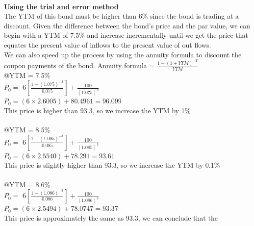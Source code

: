 \documentclass[12]{article}
\begin{document}
\noindent
\\
\textbf{Using the trial and error method}\\
The YTM of this bond must be higher than 6\% since the bond is trading at a discount.
Given the difference between the bond's price and the par value, we can begin with a YTM of 7.5\% and increase incrementally until we get the price that equates the present value of inflows to the present value of out flows.\\
We can also speed up the process by using the annuity formula to discount the coupon payments of the bond. Annuity formula = $\frac{1 - (1+ YTM)^{-T}}{YTM}$\\
@YTM = 7.5\%\\
$P_0 = $ {\Large $6[\frac{1 - (1.075)^{-3}}{0.075}] + \frac{100}{(1.075)^3}$}\\
$P_0 = (6 \times 2.6005) + 80.4961 = 96.099$\\
This price is higher than 93.3, so we increase the YTM by 1\%\\
\\
@YTM = 8.5\%\\
$P_0 = $ {\Large $6[\frac{1 - (1.085)^{-3}}{0.085}] + \frac{100}{(1.085)^3}$}\\
$P_0 = (6\times 2.5540) + 78.291 = 93.61$\\
This price is slightly higher than 93.3, so we increase the YTM by 0.1\%\\
\\
@YTM = 8.6\%\\
$P_0 = $ {\Large $6[\frac{1 - (1.086)^{-3}}{0.086}] + \frac{100}{(1.086)^3}$}\\
$P_0 = (6\times 2.5494) + 78.0747 = 93.37$\\
This price is approximately the same as 93.3, we can conclude that the 
\end{document}

